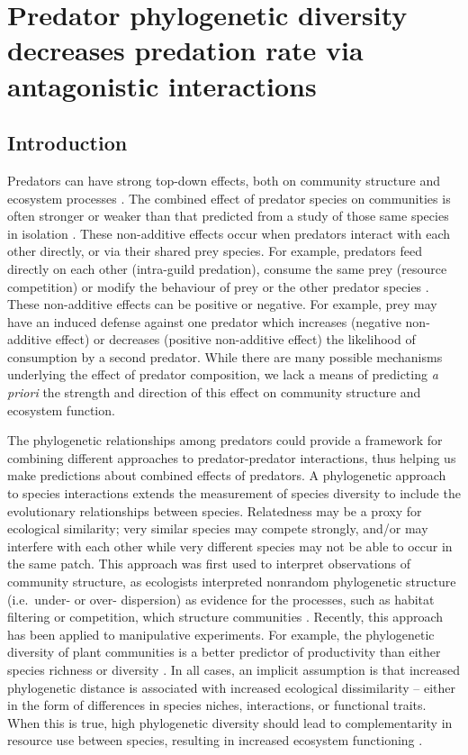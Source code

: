\chapter{Predator phylogenetic diversity decreases predation rate via antagonistic interactions}
\label{chap:pd-ef}

\section{Introduction}\label{introduction}

Predators can have strong top-down effects, both on community structure
and ecosystem processes \citep{Estes2011}. The combined effect of
predator species on communities is often stronger or weaker than that
predicted from a study of those same species in isolation
\citep{Sih1998a, Ives2005}. These non-additive effects occur when
predators interact with each other directly, or via their shared prey
species. For example, predators feed directly on each other (intra-guild
predation), consume the same prey (resource competition) or modify the
behaviour of prey or the other predator species
\citep{Sih1998a, Griswold2006, Nystrom2001}. These non-additive effects
can be positive or negative. For example, prey may have an induced
defense against one predator which increases (negative non-additive
effect) or decreases (positive non-additive effect) the likelihood of
consumption by a second predator. While there are many possible
mechanisms underlying the effect of predator composition, we lack a
means of predicting \emph{a priori} the strength and direction of this
effect on community structure and ecosystem function.

The phylogenetic relationships among predators could provide a framework for combining different approaches to predator-predator interactions, thus helping us make
predictions about combined effects of predators. A phylogenetic approach to species interactions
extends the measurement of species diversity to include the evolutionary
relationships between species. Relatedness may be a proxy for ecological similarity; very
similar species may compete strongly, and/or may interfere with each
other while very different species may not be able to occur in the same
patch. This approach was first used to interpret observations of
community structure, as ecologists interpreted nonrandom phylogenetic
structure (i.e.~under- or over- dispersion) as evidence for the
processes, such as habitat filtering or competition, which structure
communities \citep{Webb2002, Cavender-Bares2009}. Recently, this
approach has been applied to manipulative experiments. For example, the
phylogenetic diversity of plant communities is a better predictor of
productivity than either species richness or diversity
\citep[e.g.][]{Cadotte2009, Cadotte2008, Godoy2014}. In all cases, an
implicit assumption is that increased phylogenetic distance is
associated with increased ecological dissimilarity -- either in the form
of differences in species niches, interactions, or functional traits.
When this is true, high phylogenetic diversity should lead to
complementarity in resource use between species, resulting in increased
ecosystem functioning \citep{Srivastava2012c}. 

